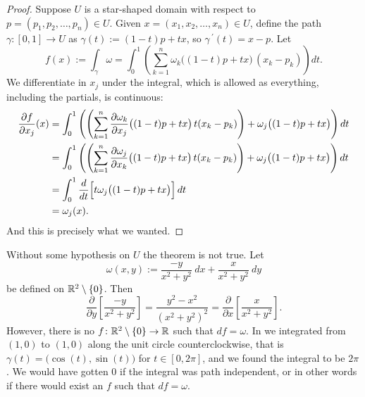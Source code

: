 \begin{proof}
Suppose $U$ is a star-shaped domain with respect to $p=(p_1,p_2,\ldots,p_n) \in U$.
Given $x = (x_1,x_2,\ldots,x_n) \in U$, define the path $\gamma \colon [0,1] \to U$ as
$\gamma(t) := (1-t)p + tx$, so $\gamma^{\:\prime}(t) = x-p$.  Let
\begin{equation*}
f(x) := \int_{\gamma} \omega
=
\int_0^1
\left(
\sum_{k=1}^n
\omega_k \bigl((1-t)p + tx \bigr) \, (x_k-p_k)
\right) dt .
\end{equation*}
We differentiate in $x_j$ under the integral, which is allowed as
everything, including the partials, is continuous:
\begin{equation*}
\begin{split}
\frac{\partial f}{\partial x_j}(x) & =
\int_0^1
\left(
\left(
\sum_{k=1}^n
\frac{\partial \omega_k}{\partial x_j} \bigl((1-t)p + tx \bigr) \, t
(x_k-p_k)
\right)
+
\omega_j \bigl((1-t)p + tx \bigr)
\right)
 dt
\\
& = 
\int_0^1
\left(
\left(
\sum_{k=1}^n
\frac{\partial \omega_j}{\partial x_k} \bigl((1-t)p + tx \bigr) \, t
(x_k-p_k)
\right)
+
\omega_j \bigl((1-t)p + tx \bigr)
\right) dt
\\
& = 
\int_0^1
\frac{d}{dt}
\Bigl[
t \omega_j\bigl((1-t)p + tx \bigr)
\Bigr]
\,
dt
\\
&= \omega_j(x) .
\end{split}
\end{equation*}
And this is precisely what we wanted.
\end{proof}

\begin{example}
Without some hypothesis on $U$ the theorem is not true.  Let
\begin{equation*}
\omega(x,y) := \frac{-y}{x^2+y^2} ~dx + \frac{x}{x^2+y^2} ~dy
\end{equation*}
be defined on ${\mathbb{R}}^2 \setminus \{ 0 \}$.  Then
\begin{equation*}
\frac{\partial}{\partial y} \left[ 
\frac{-y}{x^2+y^2} \right] =
\frac{y^2-x^2}{{(x^2+y^2)}^2}
=
\frac{\partial}{\partial x} \left[ 
\frac{x}{x^2+y^2} \right] .
\end{equation*}
However, there is no $f \colon {\mathbb{R}}^2 \setminus \{ 0 \} \to {\mathbb{R}}$ such that 
$df = \omega$.  In
 we integrated from $(1,0)$ to $(1,0)$
along the unit circle counterclockwise,
that is $\gamma(t) = \bigl(\cos(t),\sin(t)\bigr)$
for $t \in [0,2\pi]$, and we found the integral to be $2\pi$.  We would have
gotten $0$ if
the integral was path independent,
or in other words if there would exist an $f$ such that
$df = \omega$.
\end{example}

